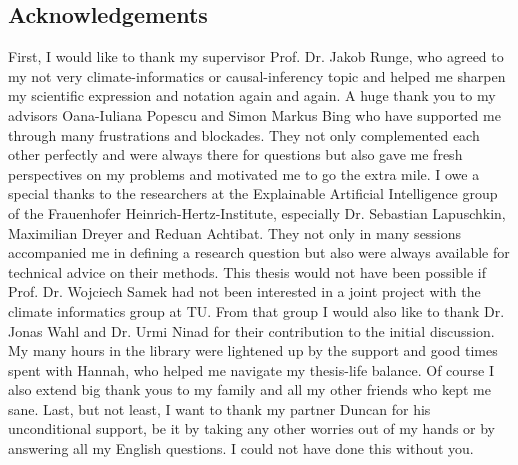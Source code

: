 \subsection*{Acknowledgements}

First, I would like to thank my supervisor Prof. Dr. Jakob Runge, who agreed to my not very climate-informatics or causal-inferency topic and helped me sharpen my scientific expression and notation again and again.
A huge thank you to my advisors Oana-Iuliana Popescu and Simon Markus Bing who have supported me through many frustrations and blockades. 
They not only complemented each other perfectly and were always there for questions but also gave me fresh perspectives on my problems and motivated me to go the extra mile.
I owe a special thanks to the researchers at the Explainable Artificial Intelligence group of the Frauenhofer Heinrich-Hertz-Institute, especially Dr. Sebastian Lapuschkin, Maximilian Dreyer and Reduan Achtibat. They not only in many sessions accompanied me in defining a research question but also were always available for technical advice on their methods. This thesis would not have been possible if Prof. Dr. Wojciech Samek had not been interested in a joint project with the climate informatics group at TU. From that group I would also like to thank Dr. Jonas Wahl and Dr. Urmi Ninad for their contribution to the initial discussion. 
My many hours in the library were lightened up by the support and good times spent with Hannah, who helped me navigate my thesis-life balance. Of course I also extend big thank yous to my family and all my other friends who kept me sane. 
Last, but not least, I want to thank my partner Duncan for his unconditional support, be it by taking any other worries out of my hands or by answering all my English questions. 
I could not have done this without you.
